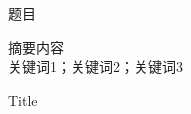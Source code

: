 
\pagestyle{fancy}
     \fancyhf{}
	 \fancyhead[CO]{\normalfont\small\rmfamily\nouppercase{\leftmark}}
     \fancyfoot[C]{-\,\thepage\,-}
     \renewcommand{\headrulewidth}{0.4pt}
     
     
\begin{cnabstract}
\begin{center}
		\heiti {}题目 \\[2em]
	\end{center}
\heiti[摘要]\quad 
\songti{}摘要内容
\\[2em]\heiti[关键词]\quad 
\songti{}关键词1；关键词2；关键词3\qquad 
\end{cnabstract}


\begin{enabstract}
\begin{center}
		\textsf{ Title} \\[2em]
\end{center}

\end{enabstract}